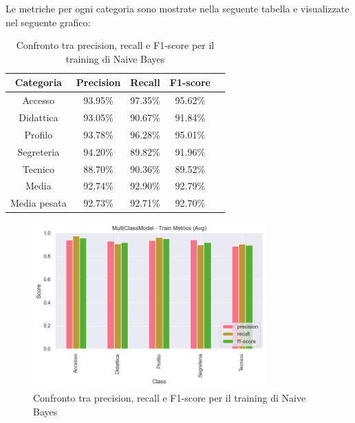 \newpage

Le metriche per ogni categoria sono mostrate nella seguente tabella e visualizzate nel seguente grafico:

\begin{table}[H]
    \centering
    \begin{tabular}{|c|c|c|c|c|}
        \hline
        \textbf{Categoria} & \textbf{Precision} & \textbf{Recall} & \textbf{F1-score} \\
        \hline
        Accesso & 93.95\% & 97.35\% & 95.62\% \\
        \hline
        Didattica & 93.05\% & 90.67\% & 91.84\% \\
        \hline
        Profilo & 93.78\% & 96.28\% & 95.01\% \\
        \hline
        Segreteria & 94.20\% & 89.82\% & 91.96\% \\
        \hline
        Tecnico & 88.70\% & 90.36\% & 89.52\% \\
        \hline
        Media & 92.74\% & 92.90\% & 92.79\% \\
        \hline
        Media pesata & 92.73\% & 92.71\% & 92.70\% \\
        \hline
    \end{tabular}
    \caption{Confronto tra precision, recall e F1-score per il training di Naive Bayes}
    \label{tab:metriche_naive_bayes_train}
\end{table}

\begin{figure}[H]
    \centering
    \includegraphics[width=0.8\textwidth]{images/metrics_train_naive_bayes.png}
    \caption{Confronto tra precision, recall e F1-score per il training di Naive Bayes}
    \label{fig:metrics_train_naive_bayes}
\end{figure}

